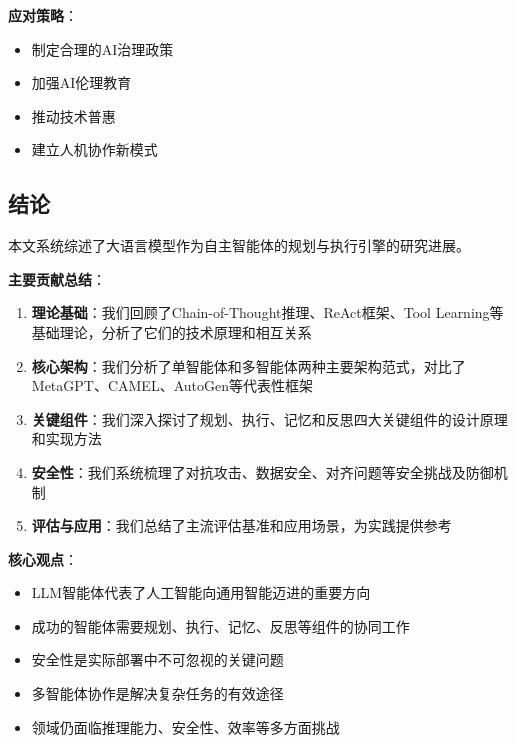 \textbf{应对策略}：
\begin{itemize}[leftmargin=2em]
    \item 制定合理的AI治理政策
    \item 加强AI伦理教育
    \item 推动技术普惠
    \item 建立人机协作新模式
\end{itemize}

\subsection{结论}

本文系统综述了大语言模型作为自主智能体的规划与执行引擎的研究进展。

\textbf{主要贡献总结}：

\begin{enumerate}[leftmargin=2em]
    \item \textbf{理论基础}：我们回顾了Chain-of-Thought推理、ReAct框架、Tool Learning等基础理论，分析了它们的技术原理和相互关系
    
    \item \textbf{核心架构}：我们分析了单智能体和多智能体两种主要架构范式，对比了MetaGPT、CAMEL、AutoGen等代表性框架
    
    \item \textbf{关键组件}：我们深入探讨了规划、执行、记忆和反思四大关键组件的设计原理和实现方法
    
    \item \textbf{安全性}：我们系统梳理了对抗攻击、数据安全、对齐问题等安全挑战及防御机制
    
    \item \textbf{评估与应用}：我们总结了主流评估基准和应用场景，为实践提供参考
\end{enumerate}

\textbf{核心观点}：

\begin{itemize}[leftmargin=2em]
    \item LLM智能体代表了人工智能向通用智能迈进的重要方向
    \item 成功的智能体需要规划、执行、记忆、反思等组件的协同工作
    \item 安全性是实际部署中不可忽视的关键问题
    \item 多智能体协作是解决复杂任务的有效途径
    \item 领域仍面临推理能力、安全性、效率等多方面挑战
\end{itemize}

